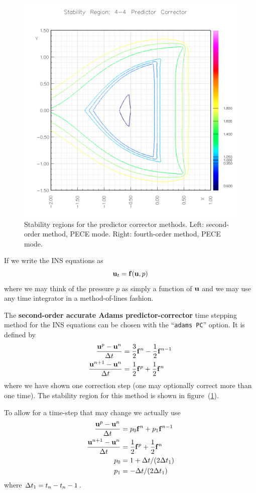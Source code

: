{\begin{figure}[hbt]
\begin{center}
   \includegraphics[width=\figWidtha]{./fig/adamsPECE44}
  \end{center}
\caption{Stability regions for the predictor corrector methods. Left: second-order method, PECE mode.
         Right: fourth-order method, PECE mode.} \label{fig:pcStabilityRegion}
\end{figure}
}

If we write the INS equations as
\[
      \mathbf{ u}_t = \mathbf{ f}(\mathbf{ u},p)
\]
where we may think of the pressure $p$ as simply a function of $\mathbf{ u}$ and we may use any time integrator
in a method-of-lines fashion.

The {\bf second-order accurate Adams predictor-corrector} time stepping method for the INS equations can be chosen
with the ``{\tt adams PC}'' option. 
It is defined by 
\begin{align*}
 { \mathbf{ u}^p - \mathbf{ u}^n \over {\Delta t}} &= {3\over2} \mathbf{ f}^n - {1\over2}\mathbf{ f}^{n-1} \\
 { \mathbf{ u}^{n+1} - \mathbf{ u}^n \over {\Delta t} } &= {1\over2} \mathbf{ f}^p + {1\over2}\mathbf{ f}^n
\end{align*}
where we have shown one correction step (one may optionally correct more than one time).
The stability region for this method is shown in figure~(\ref{fig:pcStabilityRegion}).

To allow for a time-step that may change we actually use
\begin{align*}
 { \mathbf{ u}^p - \mathbf{ u}^n \over {\Delta t}} &= p_0 \mathbf{ f}^n + p_1 \mathbf{ f}^{n-1} \\
 { \mathbf{ u}^{n+1} - \mathbf{ u}^n \over {\Delta t} } &= {1\over2} \mathbf{ f}^p + {1\over2}\mathbf{ f}^n \\
 p_0 &= 1 + {\Delta t}/(2 {\Delta t}_1) \\
 p_1 &= -{\Delta t}/(2 {\Delta t}_1)  
\end{align*}
where ${\Delta t}_1=t_n-t_n-1$.


